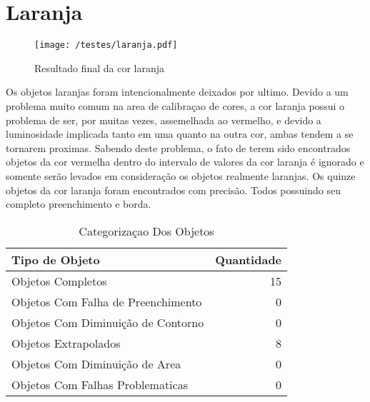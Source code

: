 \section{Laranja}
	\begin{figure}[H]
		\centering
		\texttt{[image: /testes/laranja.pdf]}
		\caption{Resultado final da cor laranja}
		\label{disposicaoparte}
	\end{figure}
	
	Os objetos laranjas foram intencionalmente deixados por ultimo.
	Devido a um problema muito comum na area de calibraçao de cores, a cor laranja possui o problema de ser, por muitas vezes, assemelhada ao vermelho, e devido a luminosidade implicada tanto em uma quanto na outra cor, ambas tendem a se tornarem proximas.
	Sabendo deste problema, o fato de terem sido encontrados objetos da cor vermelha dentro do intervalo de valores da cor laranja é ignorado e somente serão levados em consideração os objetos realmente laranjas.
	Os quinze objetos da cor laranja foram encontrados com precisão. Todos possuindo seu completo preenchimento e borda.
	
\begin{table}[h]
\centering
\begin{tabular}{l|r}
Tipo de Objeto & Quantidade \\ %
\hline                               %
Objetos Completos &  15 \\
\hline 
Objetos Com Falha de Preenchimento & 0 \\
\hline 
Objetos Com Diminuição de Contorno &  0 \\
\hline 
Objetos Extrapolados & 8 \\
\hline 
Objetos Com Diminuição de Area &  0 \\
\hline 
Objetos Com Falhas Problematicas & 0 \\
\hline 
\end{tabular}
\caption{Categorizaçao Dos Objetos}
\end{table}